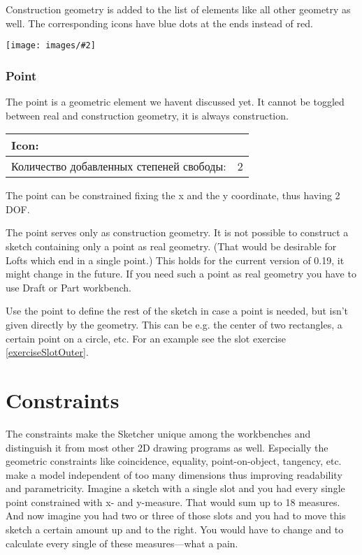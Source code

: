\documentclass[12pt,titlepage]{article}
\newcommand{\icon}[1]{\raisebox{-1em}{\rule{0pt}{27pt}\texttt{[image: images/\#1]}}}
\newcommand{\img}[2]{\vspace{2ex}\noindent\texttt{[image: images/\#2]}}
\newcommand{\dofAdded}{Количество добавленных степеней свободы:}
\let\partOrigin\part
\renewcommand\part{\newpage\partOrigin}
\begin{document}
\begin {itemize}
Construction geometry is added to the list of elements like all other geometry as well. The corresponding icons have blue dots at the ends instead of red.

\img{scale=1}{ConstructionListOfElements}

\section{Point}
\label{Point}
The point is a geometric element we havent discussed yet. It cannot be toggled between real and construction geometry, it is always construction.

\begin{tabular}{|l|l|}
\hline
Icon: & \icon{Sketcher_CreatePoint}\\
\hline
\dofAdded & 2 \\
\hline
\end{tabular}

The point can be constrained fixing the x and the y coordinate, thus having 2 DOF.

The point serves only as construction geometry. It is not possible to construct a sketch containing only a point as real geometry. (That would be desirable for Lofts which end in a single point.) This holds for the current version of 0.19, it might change in the future. If you need such a point as real geometry you have to use Draft or Part workbench.

Use the point to define the rest of the sketch in case a point is needed, but isn't given directly by the geometry. This can be e.g. the center of two rectangles, a certain point on a circle, etc. For an example see the slot exercise \vref{exerciseSlotOuter}.

\newpage

\part{Constraints}
\label{Constraints}
The constraints make the Sketcher unique among the workbenches and
distinguish it from most other 2D drawing programs as well. Especially the geometric
constraints like coincidence, equality, point-on-object, tangency, etc. make a model
independent of too many dimensions thus improving readability and parametricity.
Imagine a sketch with a single slot and you had every single point constrained with
x- and y-measure. That would sum up to 18 measures. And now imagine you had two or
three of those slots and you had to move this sketch a certain amount up and to the
right. You would have to change and to calculate every single of these measures---what a pain.


\end{itemize}
\end{document}
